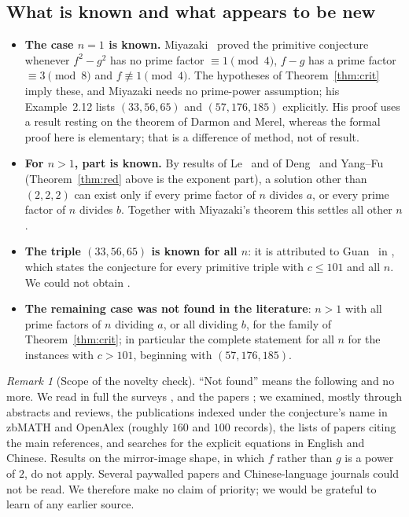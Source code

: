 \documentclass[11pt,a4paper]{article}
\theoremstyle{remark}
\newtheorem{remark}{Remark}
\begin{document}
\subsection*{What is known and what appears to be new}

\begin{itemize}
\item \textbf{The case $n=1$ is known.} Miyazaki~\cite[Theorem~1.4]{Miy09}
proved the primitive conjecture whenever $f^2-g^2$ has no prime factor
$\equiv 1 \pmod 4$, $f-g$ has a prime factor $\equiv 3 \pmod 8$ and
$f\not\equiv 1 \pmod 4$. The hypotheses of Theorem~\ref{thm:crit} imply these,
and Miyazaki needs no prime-power assumption; his Example~2.12 lists
$(33,56,65)$ and $(57,176,185)$ explicitly. His proof uses a result resting on
the theorem of Darmon and Merel, whereas the formal proof here is elementary;
that is a difference of method, not of result.
\item \textbf{For $n>1$, part is known.} By results of Le~\cite{Le99} and of
Deng~\cite{Deng} and Yang--Fu~\cite{YF} (Theorem~\ref{thm:red} above is the
exponent part), a solution other than $(2,2,2)$ can exist only if every prime
factor of $n$ divides $a$, or every prime factor of $n$ divides $b$. Together
with Miyazaki's theorem this settles all other $n$.
\item \textbf{The triple $(33,56,65)$ is known for all $n$}: it is attributed
to Guan~\cite{Guan} in \cite{Deng26}, which states the conjecture for every
primitive triple with $c\le 101$ and all $n$. We could not obtain \cite{Guan}.
\item \textbf{The remaining case was not found in the literature}: $n>1$ with
all prime factors of $n$ dividing $a$, or all dividing $b$, for the family of
Theorem~\ref{thm:crit}; in particular the complete statement for all $n$ for
the instances with $c>101$, beginning with $(57,176,185)$.
\end{itemize}

\begin{remark}[Scope of the novelty check]
``Not found'' means the following and no more. We read in full the surveys
\cite{LSS,SDCT}, and the papers \cite{Miy09,FL,Deng26}; we examined, mostly
through abstracts and reviews, the publications indexed under the conjecture's
name in zbMATH and OpenAlex (roughly $160$ and $100$ records), the lists of
papers citing the main references, and searches for the explicit equations in
English and Chinese. Results on the mirror-image shape, in which $f$ rather
than $g$ is a power of $2$, do not apply. Several paywalled papers and
Chinese-language journals could not be read. We therefore make no claim of
priority; we would be grateful to learn of any earlier source.
\end{remark}
\end{document}
